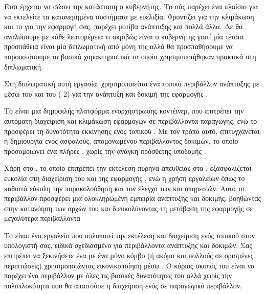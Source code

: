Έτσι έρχεται να σώσει την κατάσταση ο κυβερνήτης. Το  σάς παρέχει ένα πλαίσιο για να εκτελείτε τα κατανεμημένα συστήματα με ευελιξία. 
Φροντίζει για την κλιμάκωση και το  για την εφαρμογή σας, παρέχει μοτίβα ανάπτυξης και πολλά άλλα. Δε θα αναλύσουμε με κάθε λεπτομέρεια
τι ακριβώς είναι ο κυβερνήτης γιατί μία τέτοια προσπάθεια είναι μία διπλωματική από μόνη της αλλά θα προσπαθήσουμε να παρουσιάσουμε τα βασικά χαρακτηριστικά τα οποία
χρησιμοποιήθηκαν πρακτικά στη διπλωματική.



Στη διπλωματική αυτή εργασία, χρησιμοποιείται ένα τοπικό περιβάλλον 
ανάπτυξης με  μέσω του  και του 
( 2) για την ανάπτυξη και δοκιμή 
της εφαρμογής . 

Το  είναι μια δημοφιλής 
πλατφόρμα ενορχήστρωσης κοντέινερ, που επιτρέπει την αυτόματη 
διαχείριση και κλιμάκωση εφαρμογών σε περιβάλλοντα παραγωγής, 
ενώ το  προσφέρει τη δυνατότητα εκκίνησης ενός 
τοπικού . 
Με τον τρόπο αυτό, επιτυγχάνεται η δημιουργία ενός ασφαλούς, 
απομονωμένου περιβάλλοντος δοκιμών, το οποίο προσομοιώνει ένα 
πλήρες , χωρίς την ανάγκη πρόσθετης υποδομής .

Χάρη στο , το οποίο επιτρέπει την εκτέλεση  
πυρήνα απευθείας στα , 
εξασφαλίζεται ευκολία στη διαχείριση του  
και της εφαρμογής , 
ενώ η χρήση εργαλείων όπως το  
καθιστά εύκολη την παρακολούθηση και τον έλεγχο των  
και υπηρεσιών. Αυτό το περιβάλλον προσφέρει μια ολοκληρωμένη 
εμπειρία ανάπτυξης και δοκιμής, βοηθώντας στην κατανόηση των 
αρχών του  και διευκολύνοντας τη μετάβαση της 
εφαρμογής σε μεγαλύτερα  περιβάλλοντα

Το  είναι ένα εργαλείο που απλοποιεί την εκτέλεση και 
διαχείριση ενός τοπικού  στον υπολογιστή σας,
ειδικά σχεδιασμένο για περιβάλλοντα ανάπτυξης και δοκιμών. 
Σας επιτρέπει να ξεκινήσετε ένα  
με ένα μόνο κόμβο (ή ακόμα και πολλούς σε ορισμένες περιπτώσεις) 
χρησιμοποιώντας εικονικοποίηση μέσω . 
Ο κύριος σκοπός του  είναι να παρέχει ένα περιβάλλον  
με όλες τις βασικές δυνατότητες του  
αλλά χωρίς την πολυπλοκότητα που θα απαιτούσε η διαχείριση ενός 
σε παραγωγικό περιβάλλον.

